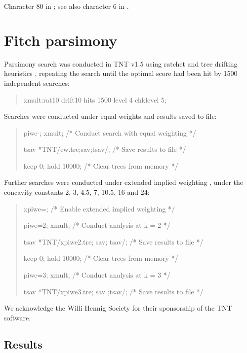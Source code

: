 \documentclass[openany]{book}
\theoremstyle{definition}
\theoremstyle{definition}
\theoremstyle{definition}
\theoremstyle{remark}
\begin{document}
Character 80 in \citet{Glenner2004}; see also character 6 in
\citet{Vinther2008}.

\hypertarget{fitch}{\chapter{Fitch parsimony}\label{fitch}}

Parsimony search was conducted in TNT v1.5 \citep{Goloboff2016} using
ratchet and tree drifting heuristics \citep{Goloboff1999, Nixon1999},
repeating the search until the optimal score had been hit by 1500
independent searches:

\begin{quote}
xmult:rat10 drift10 hits 1500 level 4 chklevel 5;
\end{quote}

Searches were conducted under equal weights and results saved to file:

\begin{quote}
piwe-; xmult; {/* Conduct search with equal weighting */}

tsav *TNT/ew.tre;sav;tsav/; {/* Save results to file */}

keep 0; hold 10000; {/* Clear trees from memory */}
\end{quote}

Further searches were conducted under extended implied weighting
\citep{Goloboff1997, Goloboff2014}, under the concavity constants 2, 3,
4.5, 7, 10.5, 16 and 24:

\begin{quote}
xpiwe=; {/* Enable extended implied weighting */}

piwe=2; xmult; {/* Conduct analysis at k = 2 */}

tsav *TNT/xpiwe2.tre; sav; tsav/; {/* Save results to file */}

keep 0; hold 10000; {/* Clear trees from memory */}

piwe=3; xmult; {/* Conduct analysis at k = 3 */}

tsav *TNT/xpiwe3.tre; sav ;tsav/; {/* Save results to file */}
\end{quote}

We acknowledge the Willi Hennig Society for their sponsorship of the TNT
software.

\section{Results}\label{results-1}
\end{document}
